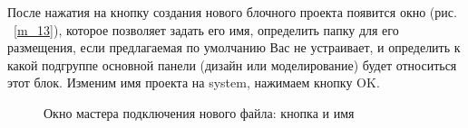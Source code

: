 \documentclass[a4paper,oneside ,10pt]{extreport}
\begin{document}
После нажатия на кнопку создания нового блочного проекта появится окно 
(рис. ~\ref{m_13}), которое позволяет задать его имя, определить папку для его размещения, 
если предлагаемая по умолчанию Вас не устраивает, и определить к какой 
подгруппе основной панели (дизайн или моделирование) будет относиться этот 
блок. Изменим имя проекта на system, нажимаем кнопку OK.

\begin{figure}[htbp]	
	\caption{Окно мастера подключения нового файла: кнопка и имя} %
\end{figure}
\end{document}
